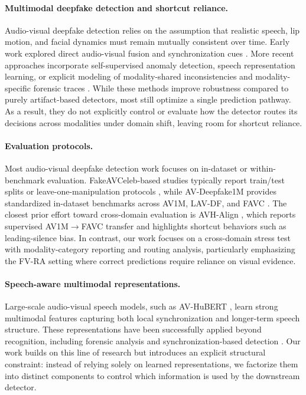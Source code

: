 \documentclass{article}
\begin{document}
\paragraph{Multimodal deepfake detection and shortcut reliance.}
Audio-visual deepfake detection relies on the assumption that realistic speech, lip motion, and facial dynamics must remain mutually consistent over time. Early work explored direct audio-visual fusion and synchronization cues \citep{zhou2021jointav, chung2016syncnet}. More recent approaches incorporate self-supervised anomaly detection, speech representation learning, or explicit modeling of modality-shared inconsistencies and modality-specific forensic traces \citep{feng2023avad, liang2024speechforensics, smeu2025avhalign, du2025cad}. 
While these methods improve robustness compared to purely artifact-based detectors, most still optimize a single prediction pathway. As a result, they do not explicitly control or evaluate how the detector routes its decisions across modalities under domain shift, leaving room for shortcut reliance.

\paragraph{Evaluation protocols.}
Most audio-visual deepfake detection work focuses on in-dataset or within-benchmark evaluation. FakeAVCeleb-based studies typically report train/test splits or leave-one-manipulation protocols \citep{feng2023avad, oorloff2024avff}, while AV-Deepfake1M provides standardized in-dataset benchmarks across AV1M, LAV-DF, and FAVC \citep{cai2024avdeepfake1m}. 
The closest prior effort toward cross-domain evaluation is AVH-Align \citep{smeu2025avhalign}, which reports supervised AV1M$\rightarrow$FAVC transfer and highlights shortcut behaviors such as leading-silence bias. In contrast, our work focuses on a cross-domain stress test with modality-category reporting and routing analysis, particularly emphasizing the FV-RA setting where correct predictions require reliance on visual evidence.

\paragraph{Speech-aware multimodal representations.}
Large-scale audio-visual speech models, such as AV-HuBERT \citep{shi2022avhubert}, learn strong multimodal features capturing both local synchronization and longer-term speech structure. These representations have been successfully applied beyond recognition, including forensic analysis and synchronization-based detection \citep{liang2024speechforensics, smeu2025avhalign}. 
Our work builds on this line of research but introduces an explicit structural constraint: instead of relying solely on learned representations, we factorize them into distinct components to control which information is used by the downstream detector.
\end{document}
